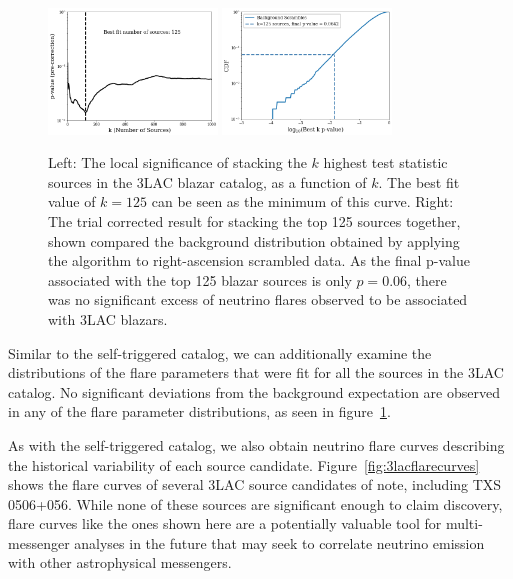 \begin{figure}[h]
\centering
\includegraphics[width=0.4\textwidth]{figs/3lac_pcurve.png}
\includegraphics[width=0.4\textwidth]{figs/3lacresult.png}
\caption{Left: The local significance of stacking the $k$ highest test statistic sources in the 3LAC blazar catalog, as a function of $k$. The best fit value of $k=125$ can be seen as the minimum of this curve. Right: The trial corrected result for stacking the top 125 sources together, shown compared the background distribution obtained by applying the algorithm to right-ascension scrambled data. As the final p-value associated with the top 125 blazar sources is only $p=0.06$, there was no significant excess of neutrino flares observed to be associated with 3LAC blazars.}
\label{fig:3lacresults}
\end{figure}

Similar to the self-triggered catalog, we can additionally examine the distributions of the flare parameters that were fit for all the sources in the 3LAC catalog. No significant deviations from the background expectation are observed in any of the flare parameter distributions, as seen in figure~\ref{fig:3lacresults}.

As with the self-triggered catalog, we also obtain neutrino flare curves describing the historical variability of each source candidate. Figure~\ref{fig:3lacflarecurves} shows the flare curves of several 3LAC source candidates of note, including TXS 0506+056. While none of these sources are significant enough to claim discovery, flare curves like the ones shown here are a potentially valuable tool for multi-messenger analyses in the future that may seek to correlate neutrino emission with other astrophysical messengers. 

